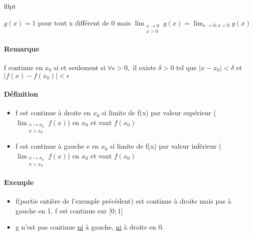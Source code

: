 \begin{wrapfigure}[5]{l}{0pt}
\end{wrapfigure}
$g(x) = 1$ pour tout x différent de 0
mais $\lim_{\substack{x\to 0 \\  x > 0}} g(x) = \lim_{x \to 0; x <0} g(x) $

\paragraph{Remarque} f continue en $x_0$ si et seulement si $\forall \epsilon > 0,$ il existe $\delta >0$ tel que $|x-x_0| < \delta$ et $|f(x) - f(x_0)| < \epsilon$

\paragraph{Définition} \begin{itemize}
\item f est continue à droite en $x_0$ si limite de f(x) par valeur supérieur (\begin{math} \lim_{\substack{x \to x_0 \\ x > x_0}} f(x) \end{math}) en $x_0$ et vaut $f(x_0)$
\item f est continue à gauche e en $x_0$ si limite de f(x) par valeur inférieur (\begin{math} \lim_{\substack{x \to x_0 \\ x < x_0}} f(x) \end{math}) en $x_0$ et vaut $f(x_0)$
\end{itemize}

\paragraph{Exemple} \begin{itemize}
	\item f(partie entière de l'exemple précédent) est continue à droite mais pas à gauche en 1. f est continue sur $[0; 1[$
	\item g n'est pas continue \ul{ni} à gauche, \ul{ni} à droite en 0.
\end{itemize}

